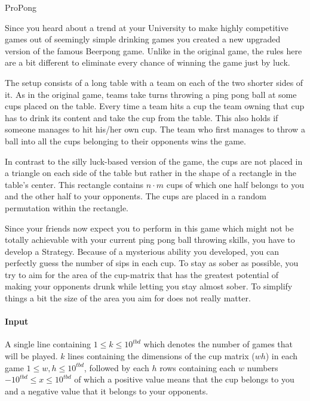 



\makeheader

ProPong

Since you heard about a trend at your University to make highly competitive games out of seemingly simple drinking games you created a new upgraded version of the famous Beerpong game. Unlike in the original game, the rules here are a bit different to eliminate every chance of winning the game just by luck. 

The setup consists of a long table with a team on each of the two shorter sides of it. As in the original game, teams take turns throwing a ping pong ball at some cups placed on the table. Every time a team hits a cup the team owning that cup has to drink its content and take the cup from the table. This also holds if someone manages to hit his/her own cup. The team who first manages to throw a ball into all the cups belonging to their opponents wins the game. 

In contrast to the silly luck-based version of the game, the cups are not placed in a triangle on each side of the table but rather in the shape of a rectangle in the table's center. This rectangle contains  $n \cdot m$ cups of which one half belongs to you and the other half to your opponents. The cups are placed in a random permutation within the rectangle.

Since your friends now expect you to perform in this game which might not be totally achievable with your current ping pong ball throwing skills, you have to develop a Strategy. Because of a mysterious ability you developed, you can perfectly guess the number of sips in each cup. To stay as sober as possible, you try to aim for the area of the cup-matrix that has the greatest potential of making your opponents drunk while letting you stay almost sober. To simplify things a bit the size of the area you aim for does not really matter.


\paragraph*{Input}

A single line containing $1\leq k \leq 10^{tbd}$  which denotes the number of games that will be played.
$k$ lines containing the dimensions of the cup matrix ($w h$) in each game $1 \leq w,h \leq 10^{tbd}$, followed by each $h$ rows containing each $w$ numbers $-10^{tbd} \leq x \leq 10^{tbd}$ of which a positive value means that the cup belongs to you and a negative value that it belongs to your opponents.

